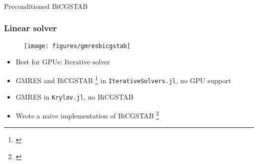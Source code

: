 
\begin{frame}
  \frametitle{}
  \centering
  {\Huge Preconditioned BiCGSTAB}
\end{frame}

\begin{frame}
  \frametitle{Linear solver}
    \begin{figure}
      \texttt{[image: figures/gmresbicgstab]}
    \end{figure}
  \begin{itemize}
    \item Best for GPUs: Iterative solver
    \item GMRES and BiCGSTAB \footnote{\cite{sleijpen1993bicgstab}} in \lstinline{IterativeSolvers.jl}, no GPU support 
    \item GMRES in \lstinline{Krylov.jl}, no BiCGSTAB 
    \item Wrote a naive implementation of BiCGSTAB \footnote{\cite{bicgstabVorst}}
  \end{itemize}
\end{frame}

